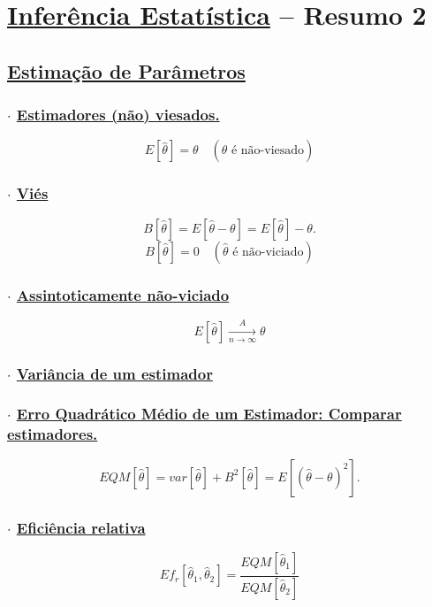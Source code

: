 \documentclass[11pt,a4paper]{article}
\begin{document}
\section*{\underline{Inferência Estatística} -- Resumo 2}

\subsection*{\underline{Estimação de Parâmetros}}

\subsubsection*{$\cdot$ \underline{Estimadores (não) viesados.}}
\[ E[\hat{\theta}] = \theta \quad (\hat{\theta} \text{ é não-viesado}) \]

\subsubsection*{$\cdot$ \underline{Viés}}
\[ B[\hat{\theta}] = E[\hat{\theta}-\theta] = E[\hat{\theta}]-\theta. \]
\[ B[\hat{\theta}] = 0 \quad (\hat{\theta} \text{ é não-viciado}) \]

\subsubsection*{$\cdot$ \underline{Assintoticamente não-viciado}}
\[ E[\hat{\theta}] \xrightarrow[n\to\infty]{A} \theta \]

\subsubsection*{$\cdot$ \underline{Variância de um estimador}}

\subsubsection*{$\cdot$ \underline{Erro Quadrático Médio de um Estimador: Comparar estimadores.}}
\[ EQM[\hat{\theta}] = var[\hat{\theta}] + B^2[\hat{\theta}] = E[(\hat{\theta}-\theta)^2]. \]

\subsubsection*{$\cdot$ \underline{Eficiência relativa}}
\[ Ef_r[\hat{\theta}_1,\hat{\theta}_2] = \frac{EQM[\hat{\theta}_1]}{EQM[\hat{\theta}_2]} \]
\end{document}
